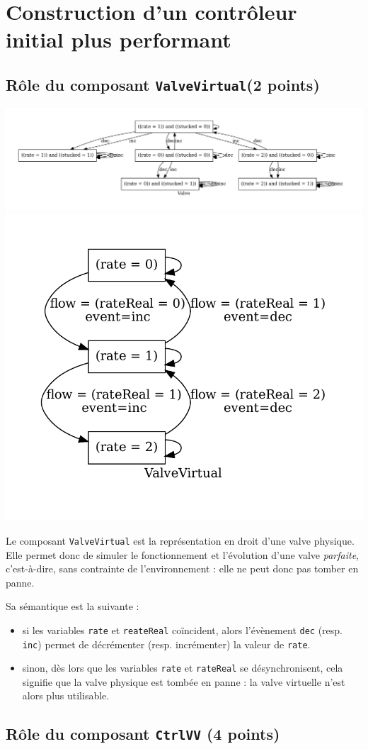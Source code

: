 \documentclass[a4paper]{book}
\begin{document}
\section{Construction d'un contrôleur initial plus performant}
\subsection{Rôle du composant {\tt ValveVirtual}(2 points)}
\includegraphics[height=.2\textheight,width=.5\textwidth]{Graphs/Valve-modes.pdf}
\includegraphics[height=.2\textheight,width=.5\textwidth]{Graphs/ValveVirtual-modes.pdf}

Le composant \texttt{ValveVirtual} est la représentation en droit d'une valve
physique. Elle permet donc de simuler le fonctionnement et l'évolution d'une
valve \textit{parfaite}, c'est-à-dire, sans contrainte de l'environnement :
elle ne peut donc pas tomber en panne.

Sa sémantique est la suivante :
\begin{itemize}
  \item si les variables \texttt{rate} et \texttt{reateReal} coïncident, alors
    l'évènement \texttt{dec} (resp. \texttt{inc}) permet de décrémenter (resp.
    incrémenter) la valeur de \texttt{rate}.
  \item sinon, dès lors que les variables \texttt{rate} et \texttt{rateReal} se
    désynchronisent, cela signifie que la valve physique est tombée en panne :
    la valve virtuelle n'est alors plus utilisable.
\end{itemize}

\subsection{Rôle du composant {\tt CtrlVV} (4 points)}
\end{document}
